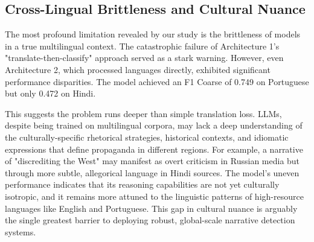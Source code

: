 \subsection{Cross-Lingual Brittleness and Cultural Nuance}

The most profound limitation revealed by our study is the brittleness of models in a true multilingual context. The catastrophic failure of Architecture 1's "translate-then-classify" approach served as a stark warning. However, even Architecture 2, which processed languages directly, exhibited significant performance disparities. The model achieved an F1 Coarse of 0.749 on Portuguese but only 0.472 on Hindi.

This suggests the problem runs deeper than simple translation loss. LLMs, despite being trained on multilingual corpora, may lack a deep understanding of the culturally-specific rhetorical strategies, historical contexts, and idiomatic expressions that define propaganda in different regions. For example, a narrative of "discrediting the West" may manifest as overt criticism in Russian media but through more subtle, allegorical language in Hindi sources. The model's uneven performance indicates that its reasoning capabilities are not yet culturally isotropic, and it remains more attuned to the linguistic patterns of high-resource languages like English and Portuguese. This gap in cultural nuance is arguably the single greatest barrier to deploying robust, global-scale narrative detection systems.